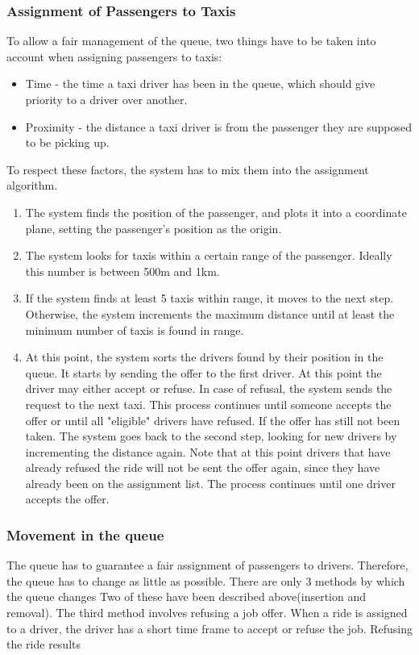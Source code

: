 	\subsubsection{Assignment of Passengers to Taxis}
		To allow a fair management of the queue, two things have to be taken into account when assigning passengers to taxis:
		\begin{itemize}
		\item Time - the time a taxi driver has been in the queue, which should give priority to a driver over another.
		\item Proximity - the distance a taxi driver is from the passenger they are supposed to be picking up.
		\end{itemize}
		To respect these factors, the system has to mix them into the assignment algorithm.\\
		\begin{enumerate}
		\item The system finds the position of the passenger, and plots it into a coordinate plane, setting the passenger's position as the origin.
		\item The system looks for taxis within a certain range of the passenger. Ideally this number is between 500m and 1km.
		\item If the system finds at least 5 taxis within range, it moves to the next step. Otherwise, the system increments the maximum distance until at least  %
		the minimum number of taxis is found in range.
		\item At this point, the system sorts the drivers found by their position in the queue. It starts by sending the offer to the first driver. At this point the driver may either
		accept or refuse. In case of refusal, the system sends the request to the next taxi. This process continues until someone accepts the offer or until all "eligible" drivers have refused.
		If the offer has still not been taken. The system goes back to the second step, looking for new drivers by incrementing the distance again. Note that at this point drivers that have already
		refused the ride will not be sent the offer again, since they have already been on the assignment list. The process continues until one driver accepts the offer.
		\end{enumerate}
	\subsubsection{Movement in the queue}
		The queue has to guarantee a fair assignment of passengers to drivers. Therefore, the queue has to change as little as possible. There are only 3 methods by which the queue changes
		Two of these have been described above(insertion and removal). The third method involves refusing a job offer. When a ride is assigned to a driver, the driver has a short time frame to
		accept or refuse the job. Refusing the ride results
		
